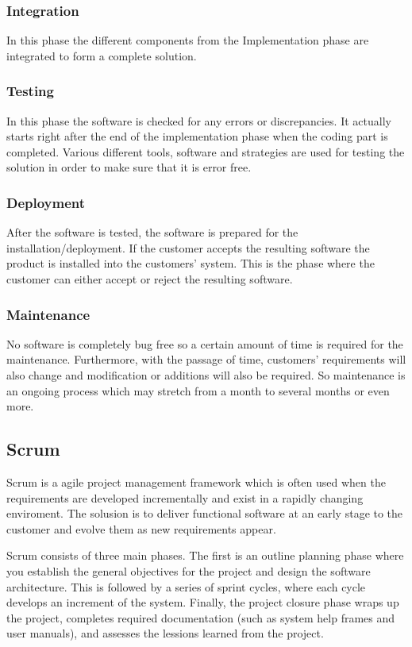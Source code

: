 \documentclass{report}
\begin{document}
\subsubsection{Integration}
In this phase the different components from the Implementation phase are integrated to form a complete solution.

\subsubsection{Testing}
In this phase the software is checked for any errors or discrepancies. It actually starts right after the end of the implementation phase when the coding part is completed. Various different tools, software and strategies are used for testing the solution in order to make sure that it is error free.

\subsubsection{Deployment}
After the software is tested, the software is prepared for the installation/deployment. If the customer accepts the resulting software the product is installed into the customers' system. This is the phase where the customer can either accept or reject the resulting software. 

\subsubsection{Maintenance}
No software is completely bug free so a certain amount of time is required for the maintenance. Furthermore, with the passage of time, customers' requirements will also change and modification or additions will also be required. So maintenance is an ongoing process which may stretch from a month to several months or even more.

\subsection{Scrum}\label{sec:scrum}
Scrum is a agile project management framework which is often used when the requirements are developed incrementally and exist in a rapidly changing enviroment. The solusion is to deliver functional software at an early stage to the customer and evolve them as new requirements appear.

Scrum consists of three main phases. The first is an outline planning phase where you establish the general objectives for the project and design the software architecture. This is followed by a series of sprint cycles, where each cycle develops an increment of the system. Finally, the project closure phase wraps up the project, completes required documentation (such as system help frames and user manuals), and assesses the lessions learned from the project.
\end{document}
